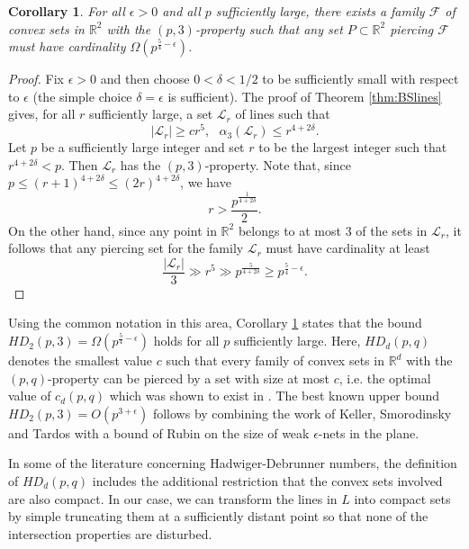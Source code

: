 \documentclass[11pt]{amsart}
\newcommand{\cL}{\mathcal{L}}
\newcommand{\cF}{\mathcal{F}}
\newtheorem{corollary}{Corollary}
\theoremstyle{remark}
\begin{document}
\begin{corollary} \label{cor:HD} For all $\epsilon >0$ and all $p$ sufficiently large, there exists a family $\cF$ of convex sets in $\mathbb R^2$ with the $(p,3)$-property such that any set $P \subset \mathbb R^2$ piercing $\cF$ must have cardinality $\Omega(p^{\frac{5}{4}-\epsilon})$.
    
\end{corollary}

\begin{proof}
Fix $\epsilon>0$ and then choose $0<\delta<1/2$ to be sufficiently small with respect to $\epsilon$ (the simple choice $\delta=\epsilon$ is sufficient). The proof of Theorem \ref{thm:BSlines} gives, for all $r$ sufficiently large, a set $\cL_r$ of lines such that
\[
|\cL_r| \geq cr^5,\,\,\,\, \alpha_3(\cL_r) \leq r^{4+2\delta}.
\]
Let $p$ be a sufficiently large integer and set $r$ to be the largest integer such that $r^{4+2\delta} < p$. Then $\cL_r$ has the $(p,3)$-property. Note that, since $p \leq (r+1)^{4+2\delta} \leq (2r)^{4+2\delta} $, we have
\[
r > \frac{p^{\frac{1}{4+2\delta}}}{2}.
\]
On the other hand, since any point in $\mathbb R^2$ belongs to at most $3$ of the sets in $\cL_r$, it follows that any piercing set for the family $\cL_r$ must have cardinality at least
\[
\frac{|\cL_r|}{3} \gg r^5 \gg p^{\frac{5}{4+2\delta}} \geq p^{\frac{5}{4}- \epsilon}.
\]
\end{proof}

Using the common notation in this area, Corollary \ref{cor:HD} states that the bound $HD_2(p,3)= \Omega(p^{\frac{5}{4}-\epsilon})$ holds for all $p$ sufficiently large. Here, $HD_d(p,q)$ denotes the smallest value $c$ such that every family of convex sets in $\mathbb R^d$ with the $(p,q)$-property can be pierced by a set with size at most $c$, i.e. the optimal value of $c_d(p,q)$ which was shown to exist in \cite{AlKl}. The best known upper bound $HD_2(p,3)=O(p^{3+\epsilon})$ follows by combining the work of Keller, Smorodinsky and Tardos \cite{KST} with a bound of Rubin \cite{Ru} on the size of weak $\epsilon$-nets in the plane. 

In some of the literature concerning Hadwiger-Debrunner numbers, the definition of $HD_d(p,q)$ includes the additional restriction that the convex sets involved are also compact. In our case, we can transform the lines in $L$ into compact sets by simple truncating them at a sufficiently distant point so that none of the intersection properties are disturbed.


\end{document}
